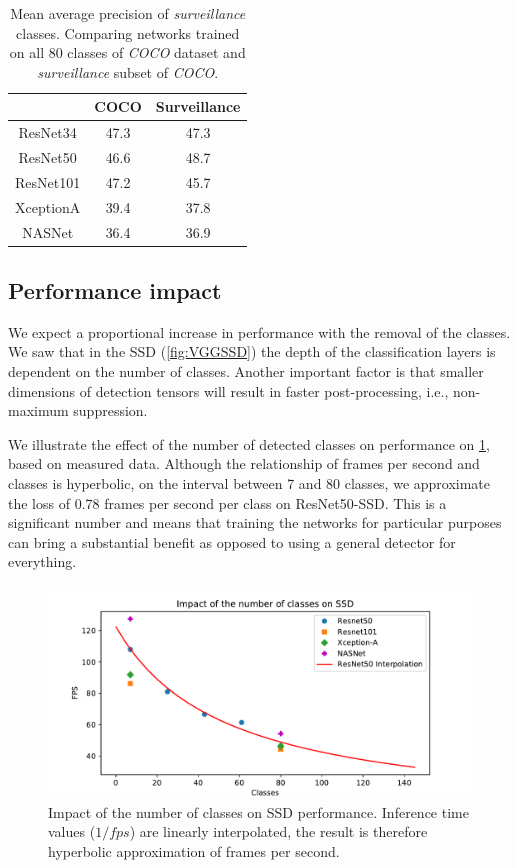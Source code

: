 \begin{table}[]
    \centering
    \begin{tabular}{c|c|c}
         & COCO & Surveillance  \\
         \hline
        ResNet34 & 47.3 & 47.3 \\
        ResNet50 & 46.6 & 48.7 \\
        ResNet101 & 47.2 & 45.7 \\
        XceptionA & 39.4 & 37.8 \\
        NASNet & 36.4 & 36.9 
    \end{tabular}
    \caption[SSD's precision comparison between COCO and surveillance datasets]{Mean average precision of \textit{surveillance} classes. Comparing networks trained on all 80 classes of \textit{COCO} dataset and \textit{surveillance} subset of \textit{COCO}.}
    \label{tab:ssdcocosurv}
\end{table}

\subsection{Performance impact}
We expect a proportional increase in performance with the removal of the classes. We saw that in the SSD (\cref{fig:VGGSSD}) the depth of the classification layers is dependent on the number of classes. Another important factor is that smaller dimensions of detection tensors will result in faster post-processing, i.e., non-maximum suppression. 

We illustrate the effect of the number of detected classes on performance on \cref{fig:fpscls}, based on measured data. Although the relationship of frames per second and classes is hyperbolic, on the interval between 7 and 80 classes, we approximate the loss of 0.78 frames per second per class on ResNet50-SSD. This is a significant number and means that training the networks for particular purposes can bring a substantial benefit as opposed to using a general detector for everything.

\begin{figure}
    \centering
    \includegraphics[width=\textwidth]{img/fps_cls}
    \caption[Impact of the number of classes on SSD performance]{Impact of the number of classes on SSD performance. Inference time values ($1/fps$) are linearly interpolated, the result is therefore hyperbolic approximation of frames per second.}
    \label{fig:fpscls}
\end{figure}


